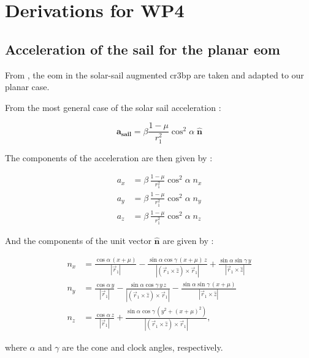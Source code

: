 \chapter{Derivations for WP4}
\label{chapter:derivations-wp4}

\section{Acceleration of the sail for the planar \ac{eom}} 
\label{section:acceleration-sail-eom}

From \cite[section 2.2.3]{mcinnes2000strategies}, the \ac{eom} in the solar-sail augmented \ac{cr3bp} are taken and adapted to our planar case. 

From the most general case of the solar sail acceleration \parencite[eq. 2.53]{mcinnes2000strategies}:

\begin{equation}
    \mathbf{a_\text{sail}} = \beta \frac{1 - \mu}{r_1^2} \cos^2\!\alpha \; \mathbf{\hat{n}}
\end{equation}

The components of the acceleration are then given by \cite[eq. 2.58-2.60]{mcinnes2000strategies}:

\begin{align}
    a_x &= \beta \,\frac{1-\mu}{r_1^2} \cos^2\!\alpha \; n_x \\
    a_y &= \beta \,\frac{1-\mu}{r_1^2} \cos^2\!\alpha \; n_y \\
    a_z &= \beta \,\frac{1-\mu}{r_1^2} \cos^2\!\alpha \; n_z
\end{align}

And the components of the unit vector $\mathbf{\hat{n}}$ are given by \cite[eq. 2.54-2.56]{mcinnes2000strategies}:

\begin{align}
n_x &= \frac{\cos\alpha\,(x+\mu)}{|\vec{r}_1|} - \frac{\sin\alpha\cos\gamma\,(x+\mu)\,z}{|(\vec{r}_1\times\hat{z})\times\vec{r}_1|} + \frac{\sin\alpha\sin\gamma\, y}{|\vec{r}_1\times\hat{z}|} \\
n_y &= \frac{\cos\alpha\, y}{|\vec{r}_1|} - \frac{\sin\alpha\cos\gamma\, y\,z}{|(\vec{r}_1\times\hat{z})\times\vec{r}_1|} - \frac{\sin\alpha\sin\gamma\,(x+\mu)}{|\vec{r}_1\times\hat{z}|} \\
n_z &= \frac{\cos\alpha\, z}{|\vec{r}_1|} + \frac{\sin\alpha\cos\gamma\,(y^2+(x+\mu)^2)}{|(\vec{r}_1\times\hat{z})\times\vec{r}_1|},
\end{align}

where $\alpha$ and $\gamma$ are the cone and clock angles, respectively.

